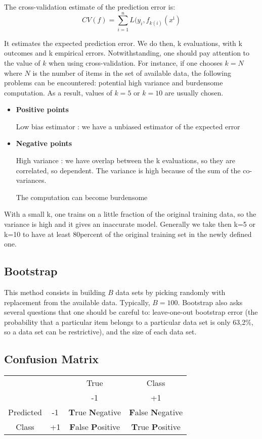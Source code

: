 \documentclass[a4paper,12pt]{article}
\begin{document}
The cross-validation estimate of the prediction error is:
\[
CV(f) = \sum_{i=1}^n L(y_i,f_{k(i)}(x^{\text{i}})
\]

It estimates the expected prediction error.
We do then, k evaluations, with k outcomes and k empirical errors.  Notwithstanding, one should pay attention to the value of $k$ when using cross-validation. For instance, if one chooses $k=N$ where $N$ is the number of items in the set of available data, the following problems can be encountered: potential high variance and burdensome computation. As a result, values of $k=5$ or $k=10$ are usually chosen.

\begin{itemize}
\item \textbf{Positive points}
	
    Low bias estimator : we have a unbiased estimator of the expected error 
\item \textbf{Negative points }
	
    High variance : we have overlap between the k evaluations, so they are correlated, so dependent. The variance is high because of the sum of the co-variances.
    
    The computation can become burdensome
\end{itemize}

With a small k, one trains on a little fraction of the original training data, so the variance is high and it gives an inaccurate model. Generally we take then k=5 or k=10 to have at least 80percent of the original training set in the newly defined one. 

\newpage
\subsection{Bootstrap}

This method consists in building $B$ data sets by picking randomly with replacement from the available data. Typically, $B=100$.
Bootstrap  also asks several questions that one should be careful to: leave-one-out bootstrap error (the probability that a particular item belongs to a particular data set is only 63,2\%, so a data set can be restrictive), and the size of each data set. 

\subsection{Confusion Matrix}

\begin{center}
\begin{tabular}{ c  c  c  c }
  & & True & Class \\ 
  &  & -1 & +1 \\  
 Predicted & -1 & \textbf{T}rue \textbf{N}egative & \textbf{F}alse \textbf{N}egative \\ 
 Class & +1 & \textbf{F}alse \textbf{P}ositive & \textbf{T}rue \textbf{P}ositive
\end{tabular}
\end{center}
\end{document}

